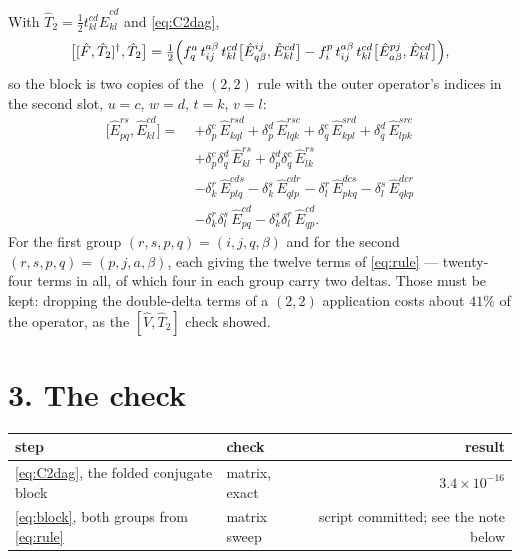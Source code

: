 \documentclass[11pt]{article}
\newcommand{\E}[2]{\hat E^{#1}_{#2}}
\newcommand{\occ}{i}
\newcommand{\vir}{a}
\begin{document}
With $\hat T_2=\tfrac12t^{cd}_{kl}\E{cd}{kl}$ and \eqref{eq:C2dag},
\begin{equation}
  \bigl[[\hat F,\hat T_2]^\dagger,\hat T_2\bigr]
   =\tfrac12\Bigl(
     f^\vir_q\,t^{\vir\beta}_{\occ j}\,t^{cd}_{kl}
       \bigl[\E{\occ j}{q\beta},\E{cd}{kl}\bigr]
    -f^p_\occ\,t^{\vir\beta}_{\occ j}\,t^{cd}_{kl}
       \bigl[\E{pj}{\vir\beta},\E{cd}{kl}\bigr]\Bigr),
  \label{eq:block}
\end{equation}
so the block is two copies of the $(2,2)$ rule with the outer operator's indices
in the second slot, $u=c$, $w=d$, $t=k$, $v=l$:
\begin{equation}
  \begin{aligned}
  \bigl[\E{rs}{pq},\E{cd}{kl}\bigr]=\;
   &+\delta^c_p\,\E{rsd}{kql}+\delta^d_p\,\E{rsc}{lqk}
    +\delta^c_q\,\E{srd}{kpl}+\delta^d_q\,\E{src}{lpk}\\
   &+\delta^c_p\delta^d_q\,\E{rs}{kl}
    +\delta^d_p\delta^c_q\,\E{rs}{lk}\\
   &-\delta^r_k\,\E{cds}{plq}-\delta^s_k\,\E{cdr}{qlp}
    -\delta^r_l\,\E{dcs}{pkq}-\delta^s_l\,\E{dcr}{qkp}\\
   &-\delta^r_k\delta^s_l\,\E{cd}{pq}
    -\delta^s_k\delta^r_l\,\E{cd}{qp}.
  \end{aligned}
  \label{eq:rule}
\end{equation}
For the first group $(r,s,p,q)=(\occ,j,q,\beta)$ and for the second
$(r,s,p,q)=(p,j,\vir,\beta)$, each giving the twelve terms of \eqref{eq:rule}
--- twenty-four terms in all, of which four in each group carry two deltas.
Those must be kept: dropping the double-delta terms of a $(2,2)$ application
costs about $41\%$ of the operator, as the $[\hat V,\hat T_2]$ check showed.

\section*{3. The check}

\begin{center}
\footnotesize
\begin{tabular}{@{}llr@{}}
\toprule
step & check & result \\
\midrule
\eqref{eq:C2dag}, the folded conjugate block & matrix, exact & $3.4\times10^{-16}$ \\
\eqref{eq:block}, both groups from \eqref{eq:rule} & matrix sweep & script committed; see the note below \\
\bottomrule
\end{tabular}
\end{center}
\end{document}
